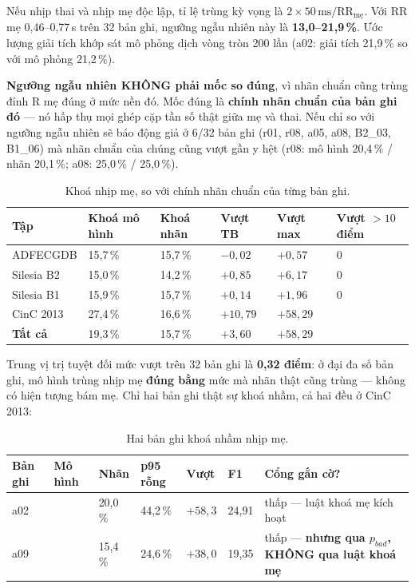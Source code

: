 Nếu nhịp thai và nhịp mẹ độc lập, tỉ lệ trùng kỳ vọng là $2 \times 50\,\text{ms} / \text{RR}_{\text{mẹ}}$.
Với RR mẹ 0,46--0,77\,s trên 32 bản ghi, ngưỡng ngẫu nhiên này là \textbf{13,0--21,9\,\%}. Ước lượng giải
tích khớp sát mô phỏng dịch vòng tròn 200 lần (a02: giải tích 21,9\,\% so với mô phỏng 21,2\,\%).

\begin{ghichu}[title={Điểm phương pháp nhóm thêm vào}]
\textbf{Ngưỡng ngẫu nhiên KHÔNG phải mốc so đúng}, vì nhãn chuẩn cũng trùng đỉnh R mẹ đúng ở mức nền đó.
Mốc đúng là \textbf{chính nhãn chuẩn của bản ghi đó} --- nó hấp thụ mọi ghép cặp tần số thật giữa mẹ và
thai. Nếu chỉ so với ngưỡng ngẫu nhiên sẽ báo động giả ở 6/32 bản ghi (r01, r08, a05, a08, B2\_03,
B1\_06) mà nhãn chuẩn của chúng cũng vượt gần y hệt (r08: mô hình 20,4\,\% / nhãn 20,1\,\%; a08:
25,0\,\% / 25,0\,\%).
\end{ghichu}

\begin{table}[H]\centering\small
\caption{Khoá nhịp mẹ, so với chính nhãn chuẩn của từng bản ghi.}
\label{tab:khoame}
\begin{tabular}{@{}L{3.0cm} C{2.4cm} C{2.4cm} C{2.2cm} C{2.2cm} C{2.0cm}@{}}
\toprule
\textbf{Tập} & \textbf{Khoá mô hình} & \textbf{Khoá nhãn} & \textbf{Vượt TB} & \textbf{Vượt max} &
\textbf{Vượt $>10$ điểm} \\
\midrule
ADFECGDB & 15,7\,\% & 15,7\,\% & $-0{,}02$ & $+0{,}57$ & 0 \\
Silesia B2 & 15,0\,\% & 14,2\,\% & $+0{,}85$ & $+6{,}17$ & 0 \\
Silesia B1 & 15,9\,\% & 15,7\,\% & $+0{,}14$ & $+1{,}96$ & 0 \\
CinC 2013 & 27,4\,\% & 16,6\,\% & $+10{,}79$ & $+58{,}29$ &  \\
\midrule
\textbf{Tất cả} & 19,3\,\% & 15,7\,\% & $+3{,}60$ & $+58{,}29$ &  \\
\bottomrule
\end{tabular}
\end{table}

Trung vị trị tuyệt đối mức vượt trên 32 bản ghi là \textbf{0,32 điểm}: ở đại đa số bản ghi, mô hình trùng
nhịp mẹ \textbf{đúng bằng} mức mà nhãn thật cũng trùng --- không có hiện tượng bám mẹ. Chỉ hai bản ghi
thật sự khoá nhầm, cả hai đều ở CinC 2013:

\begin{table}[H]\centering\small
\caption{Hai bản ghi khoá nhầm nhịp mẹ.}
\label{tab:khoame2}
\begin{tabular}{@{}C{1.4cm} C{1.8cm} C{1.6cm} C{2.0cm} C{1.6cm} C{1.2cm} L{3.6cm}@{}}
\toprule
\textbf{Bản ghi} & \textbf{Mô hình} & \textbf{Nhãn} & \textbf{p95 rỗng} & \textbf{Vượt} & \textbf{F1} &
\textbf{Cổng gắn cờ?} \\
\midrule
a02 &  & 20,0\,\% & 44,2\,\% & $+58{,}3$ & 24,91 & thấp --- luật khoá mẹ kích hoạt \\
a09 &  & 15,4\,\% & 24,6\,\% & $+38{,}0$ & 19,35 & thấp --- \textbf{nhưng qua $p_{bad}$,
KHÔNG qua luật khoá mẹ} \\
\bottomrule
\end{tabular}
\end{table}


